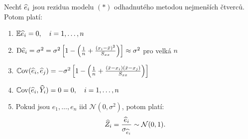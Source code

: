 \newcommand{\hx}{\bar{x}}
\newcommand{\hej}{\widehat{e}_j}
\newcommand{\Nn}{\mathcal{N}(0,\sigma^2)}
\newcommand{\hZi}{\widehat{Z}_i}
\newcommand{\hzi}{\widehat{z}_i}
\newcommand{\model}{\wbeta_0 + \wbeta_1 x_i}
\newcommand{\hYj}{\widehat{Y}_j}
\newcommand{\hr}{\widehat{r}}

\begin{theorem}
	Nechť $\widehat{e}_i$ jsou rezidua modelu $(*)$ odhadnutého metodou nejmenších čtverců. Potom platí:
	\begin{enumerate}
		\item $\mathbb{E} \widehat{e}_i = 0, \quad i = 1, \dots, n$
		\item $\D \hei = \sigma_{}^2 = \sigma^2 \left[ 1 - \left( \frac{1}{n} + \frac{(x_i - \hx)^2}{\Sxx} \right) \right] \approx \sigma^2$ pro velká $n$
		\item $\Cov (\hei, \hej) = -\sigma^2 \left[ 1 - \left( \frac{1}{n} + \frac{(\hx - x_i)(\hx - x_j)}{\Sxx} \right) \right]$
		\item $\mathbb{C}\mathrm{ov}(\widehat{e}_i, \widehat{Y}_i) = 0 = 0, \quad i = 1, \dots, n$
		\item Pokud jsou $e_1, \dots, e_n$ iid $\Nn$, potom platí:
		$$
			\hZi = \frac{\hei}{\sigma_{\hei}} \sim \NN (0,1).
		$$
	\end{enumerate}
\end{theorem}

